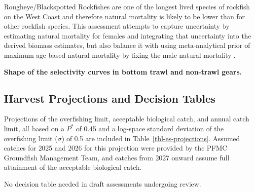 \documentclass[
]{scrartcl}
\begin{document}
Rougheye/Blackspotted Rockfishes are one of the longest lived species of
rockfish on the West Coast and therefore natural mortality is likely to
be lower than for other rockfish species. This assessment attempts to
capture uncertainty by estimating natural mortality for females and
integrating that uncertainty into the derived biomass estimates, but
also balance it with using meta-analytical prior of maximum age-based
natural mortality by fixing the male natural mortality .

\textbf{Shape of the selectivity curves in bottom trawl and non-trawl
gears.}

\subsection{Harvest Projections and Decision
Tables}\label{harvest-projections-and-decision-tables}

Projections of the overfishing limit, acceptable biological catch, and
annual catch limit, all based on a \(P^*\) of 0.45 and a log-space
standard deviation of the overfishing limit (\(\sigma\)) of 0.5 are
included in Table~\ref{tbl-es-projections}. Assumed catches for 2025 and
2026 for this projection were provided by the PFMC Groundfish Management
Team, and catches from 2027 onward assume full attainment of the
acceptable biological catch.

No decision table needed in draft assessments undergoing review.
\end{document}
